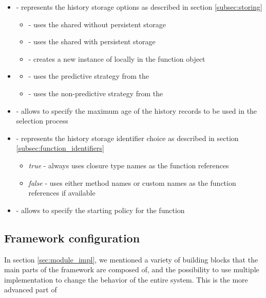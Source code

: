 \begin{itemize}
	\item {} - represents the history storage options as described in section \ref{subsec:storing}
	\begin{itemize}
		\item {} - uses the shared  without persistent storage
		\item {} - uses the shared  with persistent storage
		\item {} - creates a new instance of  locally in the function object
	\end{itemize}
\item {}
\begin{itemize}
	\item {} - uses the predictive strategy from the 
	\item {} - uses the non-predictive strategy from the 
\end{itemize}
\item {} - allows to specify the maximum age of the history records to be used in the selection process
\item {} - represents the history storage identifier choice as described in section \ref{subsec:function_identifiers}
\begin{itemize}
	\item \textit{true} - always uses closure type names as the function references
	\item \textit{false} - uses either method names or custom names as the function references if available
\end{itemize}
\item {} - allows to specify the starting policy for the function
\end{itemize}

\subsection{Framework configuration}

In section \ref{sec:module_impl}, we mentioned a variety of building blocks that the main parts of the framework are composed of, and the possibility to use multiple implementation to change the behavior of the entire system. This is the more advanced part of
